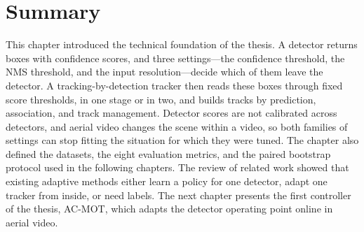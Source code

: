 \section{Summary}\label{sec:bg-summary}
This chapter introduced the technical foundation of the thesis. A detector returns boxes with confidence scores, and three settings---the confidence threshold, the NMS threshold, and the input resolution---decide which of them leave the detector. A tracking-by-detection tracker then reads these boxes through fixed score thresholds, in one stage or in two, and builds tracks by prediction, association, and track management. Detector scores are not calibrated across detectors, and aerial video changes the scene within a video, so both families of settings can stop fitting the situation for which they were tuned. The chapter also defined the datasets, the eight evaluation metrics, and the paired bootstrap protocol used in the following chapters. The review of related work showed that existing adaptive methods either learn a policy for one detector, adapt one tracker from inside, or need labels. The next chapter presents the first controller of the thesis, AC-MOT, which adapts the detector operating point online in aerial video.
